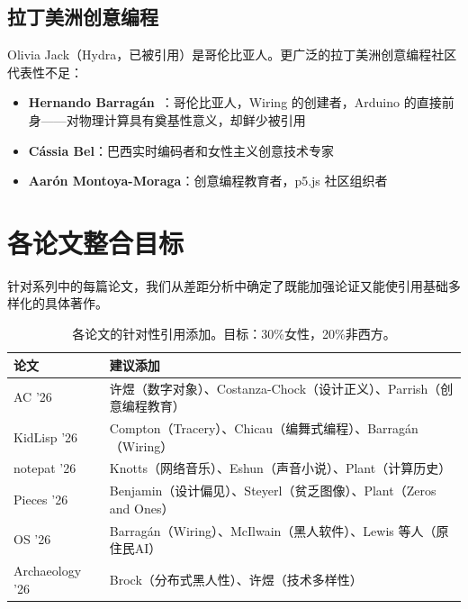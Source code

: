 \documentclass[10pt,letterpaper,twocolumn]{article}
\begin{document}
\subsection{拉丁美洲创意编程}

Olivia Jack（Hydra，已被引用）是哥伦比亚人。更广泛的拉丁美洲创意编程社区代表性不足：

\begin{itemize}
  \item \textbf{Hernando Barrag\'an}~\citep{barragan2004wiring}：哥伦比亚人，Wiring 的创建者，Arduino 的直接前身——对物理计算具有奠基性意义，却鲜少被引用
  \item \textbf{C\'assia Bel}：巴西实时编码者和女性主义创意技术专家
  \item \textbf{Aar\'on Montoya-Moraga}：创意编程教育者，p5.js 社区组织者
\end{itemize}


\section{各论文整合目标}

针对系列中的每篇论文，我们从差距分析中确定了既能加强论证又能使引用基础多样化的具体著作。

\begin{table}[h]
\small
\centering
\begin{tabularx}{\columnwidth}{lX}
\toprule
\textbf{论文} & \textbf{建议添加} \\
\midrule
AC '26 & 许煜（数字对象）、Costanza-Chock（设计正义）、Parrish（创意编程教育） \\
\addlinespace
KidLisp '26 & Compton（Tracery）、Chicau（编舞式编程）、Barrag\'an（Wiring） \\
\addlinespace
notepat '26 & Knotts（网络音乐）、Eshun（声音小说）、Plant（计算历史） \\
\addlinespace
Pieces '26 & Benjamin（设计偏见）、Steyerl（贫乏图像）、Plant（Zeros and Ones） \\
\addlinespace
OS '26 & Barrag\'an（Wiring）、McIlwain（黑人软件）、Lewis 等人（原住民AI） \\
\addlinespace
Archaeology '26 & Brock（分布式黑人性）、许煜（技术多样性） \\
\bottomrule
\end{tabularx}
\caption{各论文的针对性引用添加。目标：30\%女性，20\%非西方。}
\label{tab:targets}
\end{table}
\end{document}
